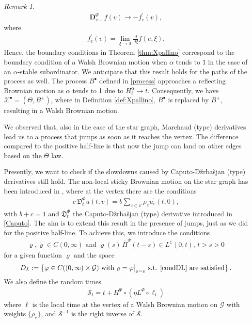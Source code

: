 \documentclass[11pt,a4paper]{article}
\theoremstyle{plain}
\theoremstyle{definition}
\theoremstyle{remark}
\newtheorem{remark}{Remark}
\begin{document}
\begin{remark}
\begin{align*}
				\mathbf{D}^\Phi_{v-} f(v) \longrightarrow - f^\prime_e(v),
			\end{align*}
			where
			\begin{align*}
				f^\prime_e(v)=\lim_{\xi \to 0} \frac{d}{d\xi} f(e,\xi).
			\end{align*}
			Hence, the boundary conditions in Theorem \ref{thm:Xpallino} correspond to the boundary condition of a Walsh Brownian motion when $\alpha$ tends to $1$ in the case of an $\alpha$-stable subordinator. We anticipate that this result holds for the paths of the process as well. The process $B^\bullet$ defined in \eqref{process} approaches a reflecting Brownian motion as $\alpha$ tends to 1 due to $H_t^\alpha \to t$. Consequently, we have $\mathcal{X}^\bullet= (\Theta, B^+)$, where in Definition \ref{def:Xpallino}, $B^\bullet$ is replaced by $B^+$, resulting in a Walsh Brownian motion.
		\end{remark}
		We observed that, also in the case of the star graph, Marchaud (type) derivatives lead us to a process that jumps as soon as it reaches the vertex. The difference compared to the positive half-line is that now the jump can land on other edges based on the $\Theta$ law.
		
		Presently, we want to check if the slowdowns caused by Caputo-D\v{z}rba\v{s}jan (type) derivatives still hold. The non-local sticky Brownian motion on the star graph has been introduced in \cite[Theorem 22]{BonDov}, where at the vertex there are the conditions
		\begin{align*}
			\displaystyle
			c \,\mathfrak{D}_t^\Phi u(t,v)=b \sum_{e \in \mathcal{E}} \rho_e u^\prime_e(t,0),
		\end{align*}
		with  $b+c=1$ and $\mathfrak{D}_t^\Phi$ the Caputo-D\v{z}rba\v{s}jan (type) derivative introduced in \eqref{Caputo}. The aim is to extend this result in the presence of jumps, just as we did for the positive half-line. To achieve this, we introduce the conditions
		\begin{align}
			\varrho, \dot{\varrho} \in C(0,\infty) \text{ and }  \dot{\varrho}(s) \, \overline{\Pi}^\Psi(t-s) \in L^1(0,t),\, t>s>0
			\label{condDL}
		\end{align}
		for a given function $\varrho$ and the space
		\begin{align*}
			D_L:=\left\{\varphi \in C((0,\infty) \times \mathcal{G}) \text{ with } \varrho=\varphi\big\vert_{\mathsf{x}=v} \text{ s.t. $\eqref{condDL}$ are satisfied}   \right\}.
		\end{align*}
		We also define the random times
		\begin{align*}
			\mathcal{S}_t=t+ H^\Psi \circ \left(\eta L^\Phi \circ \ell_t\right)
		\end{align*}
		where $\ell$ is the local time at the vertex of a Walsh Brownian motion on $\mathcal{G}$ with weights $\{\rho_e\}$, and $\mathcal{S}^{-1}$ is the right inverse of $\mathcal{S}$.
		
\end{document}
